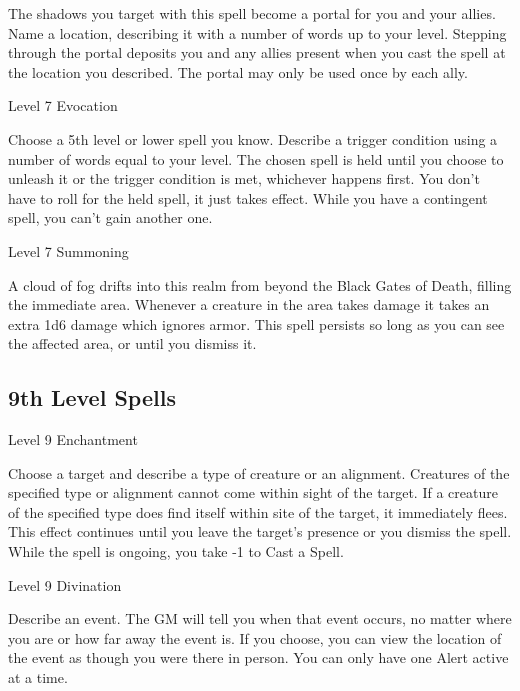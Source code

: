 The shadows you target with this spell become a portal for you and your allies. Name a location, describing it with a number of words up to your level. Stepping through the portal deposits you and any allies present when you cast the spell at the location you described. The portal may only be used once by each ally.

       
\startSpellName
          	Level 7	Evocation
\stopSpellName
       

Choose a 5th level or lower spell you know. Describe a trigger condition using a number of words equal to your level. The chosen spell is held until you choose to unleash it or the trigger condition is met, whichever happens first. You don't have to roll for the held spell, it just takes effect. While you have a contingent spell, you can't gain another one.

       
\startSpellName
          	Level 7	Summoning
\stopSpellName
       

A cloud of fog drifts into this realm from beyond the Black Gates of Death, filling the immediate area. Whenever a creature in the area takes damage it takes an extra 1d6 damage which ignores armor. This spell persists so long as you can see the affected area, or until you dismiss it.

     

     

       
\subsection{9th Level Spells}     
       
\startSpellName
          	Level 9	Enchantment
\stopSpellName
       

Choose a target and describe a type of creature or an alignment. Creatures of the specified type or alignment cannot come within sight of the target. If a creature of the specified type does find itself within site of the target, it immediately flees. This effect continues until you leave the target's presence or you dismiss the spell. While the spell is ongoing, you take -1 to Cast a Spell.

       
\startSpellName
          	Level 9	Divination
\stopSpellName
       

Describe an event. The GM will tell you when that event occurs, no matter where you are or how far away the event is. If you choose, you can view the location of the event as though you were there in person. You can only have one Alert active at a time.

